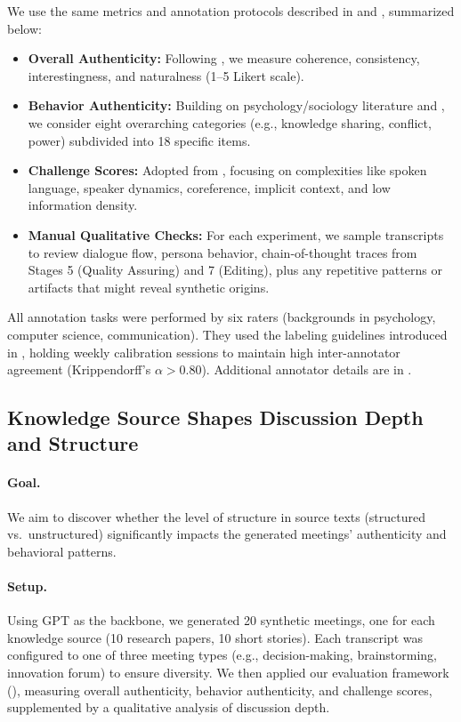 We use the same metrics and annotation protocols described in  and , summarized below:

\begin{itemize}[leftmargin=1em]
    \item \textbf{Overall Authenticity:} Following \citet{ChenPTK23}, we measure coherence, consistency, interestingness, and naturalness (1--5 Likert scale).
    \item \textbf{Behavior Authenticity:} Building on psychology/sociology literature \cite{ChoiAVQ20,bales2009interaction} and , we consider eight overarching categories (e.g., knowledge sharing, conflict, power) subdivided into 18 specific items.
    \item \textbf{Challenge Scores:} Adopted from \citet{KirsteinWRG24a}, focusing on complexities like spoken language, speaker dynamics, coreference, implicit context, and low information density.
    \item \textbf{Manual Qualitative Checks:} For each experiment, we sample transcripts to review dialogue flow, persona behavior, chain-of-thought traces from Stages 5 (Quality Assuring) and 7 (Editing), plus any repetitive patterns or artifacts that might reveal synthetic origins.
\end{itemize}

All annotation tasks were performed by six raters (backgrounds in psychology, computer science, communication). They used the labeling guidelines introduced in , holding weekly calibration sessions to maintain high inter-annotator agreement (Krippendorff’s $\alpha > 0.80$). Additional annotator details are in .

\subsection{Knowledge Source Shapes Discussion Depth and Structure}
\label{sec:app_knowledge_source}

\paragraph{Goal.}
We aim to discover whether the level of structure in source texts (structured vs.\ unstructured) significantly impacts the generated meetings’ authenticity and behavioral patterns.

\paragraph{Setup.}
Using GPT as the backbone, we generated 20 synthetic meetings, one for each knowledge source (10 research papers, 10 short stories). Each transcript was configured to one of three meeting types (e.g., decision-making, brainstorming, innovation forum) to ensure diversity. We then applied our evaluation framework (), measuring overall authenticity, behavior authenticity, and challenge scores, supplemented by a qualitative analysis of discussion depth.

